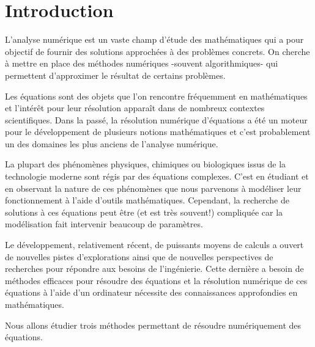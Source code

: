 
\setcounter{section}{-1}
\section{Introduction}
L'analyse numérique est un vaste champ d'étude des mathématiques qui a pour objectif de fournir des solutions approchées à des problèmes concrets. On cherche à mettre en place des méthodes numériques -souvent algorithmiques- qui permettent d'approximer le résultat de certains problèmes.%


\medskip Les équations sont des objets que l'on rencontre fréquemment en mathématiques et l'intérêt pour leur résolution apparaît dans de nombreux contextes scientifiques. Dans la passé, la résolution numérique d'équations a été un moteur pour le développement de plusieurs notions  mathématiques et c'est probablement un des domaines les plus anciens de l'analyse numérique.

\medskip La plupart des phénomènes physiques, chimiques ou biologiques issus de la technologie moderne sont régis par des équations complexes. C'est en étudiant et en observant la nature de ces phénomènes que nous parvenons à modéliser leur fonctionnement à l'aide d'outils mathématiques. Cependant, la recherche de solutions à ces équations peut être (et est très souvent!) compliquée car la modélisation fait intervenir beaucoup de paramètres.


\medskip Le développement, relativement récent, de puissants moyens de calculs a ouvert de nouvelles pistes d'explorations ainsi que de nouvelles perspectives de recherches pour répondre aux besoins de l'ingénierie. Cette dernière a besoin de méthodes efficaces pour résoudre des équations et  la résolution numérique de ces équations à l'aide d'un ordinateur nécessite des connaissances approfondies en mathématiques.

\medskip
Nous allons étudier trois méthodes permettant de résoudre numériquement des équations.



